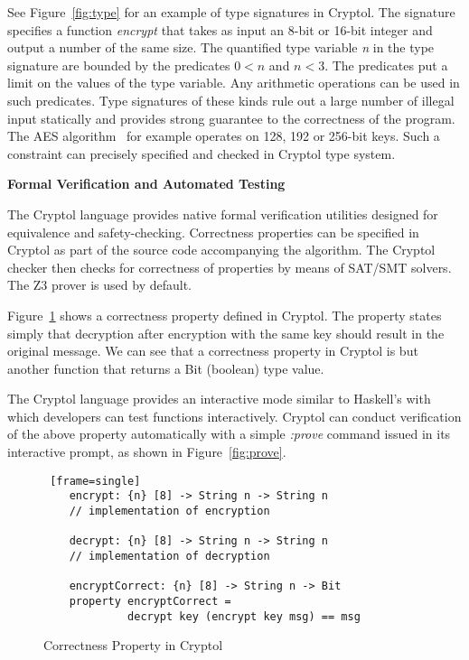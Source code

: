 \documentclass[a4paper, notitlepage]{report}
\renewcommand{\paragraph}[1]{\vspace*{1em}\noindent\textbf{#1}\hspace*{1em}}
\begin{document}
See Figure~\ref{fig:type} for an example of type signatures in Cryptol.
The signature specifies a function \emph{encrypt} that takes as input
an 8-bit or 16-bit integer and output a number of the same size.
The quantified type variable \emph{n} in the type signature are bounded
by the predicates $ 0 < n$ and $n < 3$. The predicates put a limit on the
values of the type variable. Any arithmetic operations can be used in
such predicates.
Type signatures of these kinds rule out a large number of illegal input
statically and provides strong guarantee to the correctness of the program.
The AES algorithm~\cite{standard2001announcing} for example operates on 128, 192
or 256-bit keys. Such a constraint can precisely specified and checked in
Cryptol type system.

\paragraph{Formal Verification and Automated Testing}

The Cryptol language provides native formal verification utilities designed for
equivalence and safety-checking. Correctness properties can be specified in Cryptol
as part of the source code accompanying the algorithm. The Cryptol checker then
checks for correctness of properties by means of SAT/SMT solvers. The Z3 prover is used
by default.

Figure~\ref{fig:property} shows a correctness property defined in Cryptol. The
property states simply that decryption after encryption with the same key should
result in the original message. We can see that a correctness property in Cryptol
is but another function that returns a Bit (boolean) type value.

The Cryptol language provides an interactive mode similar to Haskell's with which
developers can test functions interactively.
Cryptol can conduct verification of the above property automatically with a simple
\emph{:prove} command issued in its interactive prompt, as shown in Figure~\ref{fig:prove}.

\begin{figure}
  \begin{lstlisting} [frame=single]
    encrypt: {n} [8] -> String n -> String n
    // implementation of encryption
    
    decrypt: {n} [8] -> String n -> String n
    // implementation of decryption

    encryptCorrect: {n} [8] -> String n -> Bit
    property encryptCorrect =
             decrypt key (encrypt key msg) == msg 
  \end{lstlisting}
  
  \caption{Correctness Property in Cryptol}
  \label{fig:property}
\end{figure}
\end{document}
